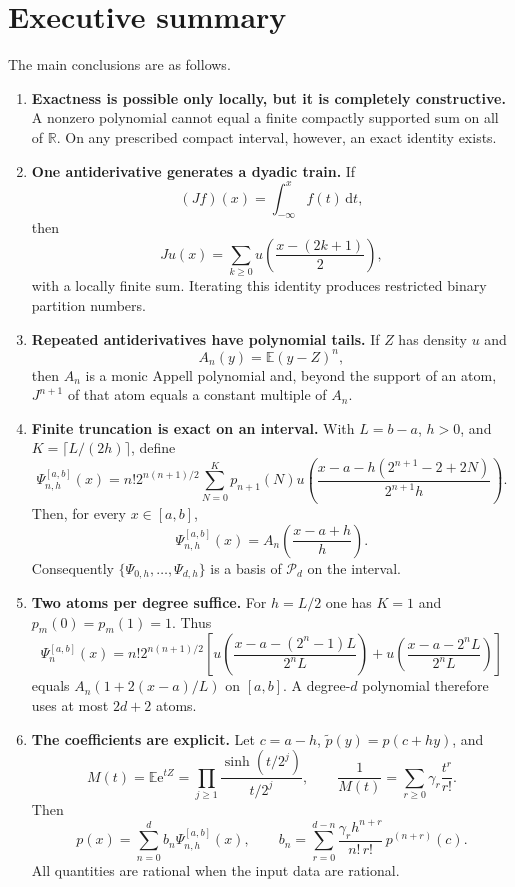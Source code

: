 \documentclass[11pt]{article}
\theoremstyle{definition}
\theoremstyle{remark}
\newcommand{\R}{\mathbb{R}}
\newcommand{\Pp}{\mathcal{P}}
\newcommand{\E}{\mathbb{E}}
\newcommand{\1}{\mathbf{1}}
\newcommand{\dd}{\,\mathrm{d}}
\newcommand{\e}{\mathrm{e}}
\begin{document}
\tableofcontents
\newpage

\section{Executive summary}

The main conclusions are as follows.

\begin{enumerate}
\item \textbf{Exactness is possible only locally, but it is completely constructive.}
A nonzero polynomial cannot equal a finite compactly supported sum on all of
$\R$.  On any prescribed compact interval, however, an exact identity exists.

\item \textbf{One antiderivative generates a dyadic train.}
If
\[
  (Jf)(x)=\int_{-\infty}^{x}f(t)\dd t,
\]
then
\[
  Ju(x)=\sum_{k\geq0}u\!\left(\frac{x-(2k+1)}2\right),
\]
with a locally finite sum.  Iterating this identity produces restricted binary
partition numbers.

\item \textbf{Repeated antiderivatives have polynomial tails.}
If $Z$ has density $u$ and
\[
  A_n(y)=\E (y-Z)^n,
\]
then $A_n$ is a monic Appell polynomial and, beyond the support of an atom,
$J^{n+1}$ of that atom equals a constant multiple of $A_n$.

\item \textbf{Finite truncation is exact on an interval.}
With $L=b-a$, $h>0$, and $K=\lceil L/(2h)\rceil$, define
\[
\Psi_{n,h}^{[a,b]}(x)
 =n!2^{n(n+1)/2}\sum_{N=0}^{K}p_{n+1}(N)
 u\!\left(
 \frac{x-a-h(2^{n+1}-2+2N)}{2^{n+1}h}
 \right).
\]
Then, for every $x\in[a,b]$,
\[
  \Psi_{n,h}^{[a,b]}(x)
  =A_n\!\left(\frac{x-a+h}{h}\right).
\]
Consequently $\{\Psi_{0,h},\ldots,\Psi_{d,h}\}$ is a basis of $\Pp_d$ on the
interval.

\item \textbf{Two atoms per degree suffice.}
For $h=L/2$ one has $K=1$ and $p_m(0)=p_m(1)=1$.  Thus
\[
\Psi_n^{[a,b]}(x)=n!2^{n(n+1)/2}
\left[
 u\!\left(\frac{x-a-(2^n-1)L}{2^nL}\right)
 +u\!\left(\frac{x-a-2^nL}{2^nL}\right)
\right]
\]
equals $A_n(1+2(x-a)/L)$ on $[a,b]$.  A degree-$d$ polynomial therefore uses
at most $2d+2$ atoms.

\item \textbf{The coefficients are explicit.}
Let $c=a-h$, $\widetilde p(y)=p(c+hy)$, and
\[
 M(t)=\E\e^{tZ}=\prod_{j\geq1}\frac{\sinh(t/2^j)}{t/2^j},
 \qquad
 \frac1{M(t)}=\sum_{r\geq0}\gamma_r\frac{t^r}{r!}.
\]
Then
\[
 p(x)=\sum_{n=0}^{d}b_n\Psi_{n,h}^{[a,b]}(x),\qquad
 b_n=\sum_{r=0}^{d-n}
 \frac{\gamma_r h^{n+r}}{n!\,r!}\,p^{(n+r)}(c).
\]
All quantities are rational when the input data are rational.


\end{enumerate}
\end{document}
